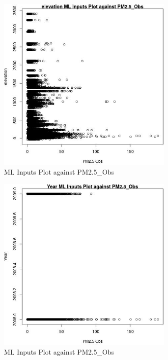 \begin{figure} 
\centering  
\includegraphics[width=0.77\textwidth]{Code_Outputs/Report_ML_input_PM25_Step4_part_e_de_duplicated_aves_elevationvPM25_Obs.jpg} 
\caption{\label{fig:Report_ML_input_PM25_Step4_part_e_de_duplicated_aveselevationvPM25_Obs}ML Inputs Plot against PM2.5_Obs} 
\end{figure} 
 

\begin{figure} 
\centering  
\includegraphics[width=0.77\textwidth]{Code_Outputs/Report_ML_input_PM25_Step4_part_e_de_duplicated_aves_YearvPM25_Obs.jpg} 
\caption{\label{fig:Report_ML_input_PM25_Step4_part_e_de_duplicated_avesYearvPM25_Obs}ML Inputs Plot against PM2.5_Obs} 
\end{figure} 
 

